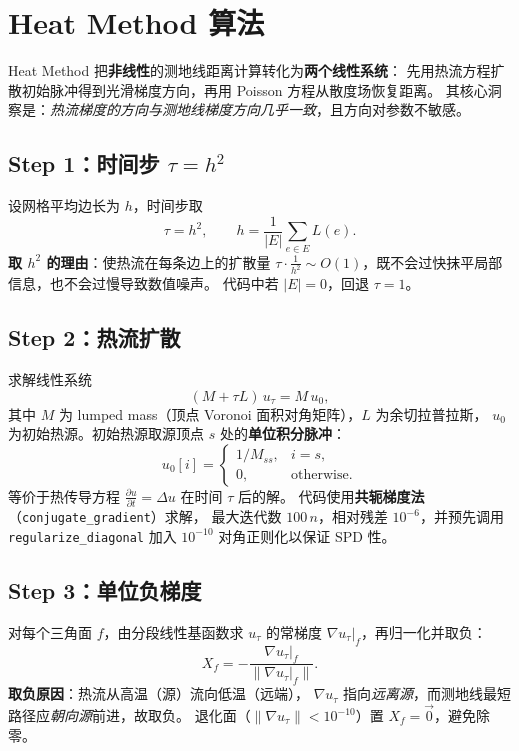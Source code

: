 \documentclass[11pt,a4paper]{article}
\begin{document}
\section{Heat Method 算法}

Heat Method 把\textbf{非线性}的测地线距离计算转化为\textbf{两个线性系统}：
先用热流方程扩散初始脉冲得到光滑梯度方向，再用 Poisson 方程从散度场恢复距离。
其核心洞察是：\emph{热流梯度的方向与测地线梯度方向几乎一致}，且方向对参数不敏感。

\subsection{Step 1：时间步 \texorpdfstring{$\tau = h^2$}{tau = h\^{}2}}

设网格平均边长为 $h$，时间步取
\[
  \tau = h^2, \qquad
  h = \frac{1}{|E|}\sum_{e \in E} L(e).
\]
\textbf{取 $h^2$ 的理由}：使热流在每条边上的扩散量
$\tau \cdot \frac{1}{h^2} \sim O(1)$，既不会过快抹平局部信息，也不会过慢导致数值噪声。
代码中若 $|E| = 0$，回退 $\tau = 1$。

\subsection{Step 2：热流扩散}

求解线性系统
\[
  (M + \tau L)\, u_\tau = M\, u_0,
\]
其中 $M$ 为 lumped mass（顶点 Voronoi 面积对角矩阵），$L$ 为余切拉普拉斯，
$u_0$ 为初始热源。初始热源取源顶点 $s$ 处的\textbf{单位积分脉冲}：
\[
  u_0[i] =
  \begin{cases}
    1 / M_{ss}, & i = s, \\
    0,          & \text{otherwise}.
  \end{cases}
\]
等价于热传导方程 $\frac{\partial u}{\partial t} = \Delta u$ 在时间 $\tau$ 后的解。
代码使用\textbf{共轭梯度法}（\texttt{conjugate\_gradient}）求解，
最大迭代数 $100\,n$，相对残差 $10^{-6}$，并预先调用
\texttt{regularize\_diagonal} 加入 $10^{-10}$ 对角正则化以保证 SPD 性。

\subsection{Step 3：单位负梯度}

对每个三角面 $f$，由分段线性基函数求 $u_\tau$ 的常梯度
$\nabla u_\tau|_f$，再归一化并取负：
\[
  X_f = -\frac{\nabla u_\tau|_f}{\|\nabla u_\tau|_f\|}.
\]
\textbf{取负原因}：热流从高温（源）流向低温（远端），
$\nabla u_\tau$ 指向\emph{远离源}，而测地线最短路径应\emph{朝向源}前进，故取负。
退化面（$\|\nabla u_\tau\| < 10^{-10}$）置 $X_f = \vec{0}$，避免除零。
\end{document}
